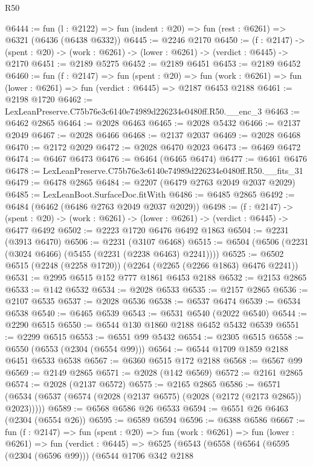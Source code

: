 \begin{lexlean}{R50}
\begin{coremodule}
@6444 := fun (l : @2122) => fun (indent : @20) => fun (rest : @6261) => @6321 (@6436 (@6438 @6332))
@6445 := @2246 @2170
@6450 := (f : @2147) ->
  (spent : @20) -> (work : @6261) -> (lower : @6261) -> (verdict : @6445) -> @2170
@6451 := @2189 @5275
@6452 := @2189 @6451
@6453 := @2189 @6452
@6460 := fun (f : @2147) =>
  fun (spent : @20) =>
  fun (work : @6261) => fun (lower : @6261) => fun (verdict : @6445) => @2187 @6453 @2188
@6461 := @2198 @1720
@6462 := LexLeanPreserve.C75b76e3c6140e74989d226234e0480ff.R50.__enc_3
@6463 := @6462 @2865
@6464 := @2028 @6463
@6465 := @2028 @5432
@6466 := @2137 @2049
@6467 := @2028 @6466
@6468 := @2137 @2037
@6469 := @2028 @6468
@6470 := @2172 @2029
@6472 := @2028 @6470 @2023
@6473 := @6469 @6472
@6474 := @6467 @6473
@6476 := @6464 (@6465 @6474)
@6477 := @6461 @6476
@6478 := LexLeanPreserve.C75b76e3c6140e74989d226234e0480ff.R50.__fits_31
@6479 := @6478 @2865
@6484 := @2207 (@6479 @2763 @2049 @2037 @2029)
@6485 := LexLeanBoot.SurfaceDoc.fitWith
@6486 := @6485 @2865
@6492 := @6484 (@6462 (@6486 @2763 @2049 @2037 @2029))
@6498 := (f : @2147) ->
  (spent : @20) -> (work : @6261) -> (lower : @6261) -> (verdict : @6445) -> @6477 @6492
@6502 := @2223 @1720 @6476 @6492 @1863
@6504 := @2231 (@3913 @6470)
@6506 := @2231 (@3107 @6468)
@6515 := @6504 (@6506 (@2231 (@3024 @6466) (@5455 (@2231 (@2238 @6463) @2241))))
@6525 := @6502 @6515 (@2248 (@2258 @1720)) (@2264 (@2265 (@2266 @1863) @6476 @2241))
@6531 := @2995 @6515 @152 @777 @1861 @6453 @2188
@6532 := @2153 @2865
@6533 := @142 @6532
@6534 := @2028 @6533
@6535 := @2157 @2865
@6536 := @2107 @6535
@6537 := @2028 @6536
@6538 := @6537 @6474
@6539 := @6534 @6538
@6540 := @6465 @6539
@6543 := @6531 @6540 (@2022 @6540)
@6544 := @2290 @6515
@6550 := @6544 @130 @1860 @2188 @6452 @5432 @6539
@6551 := @2299 @6515
@6553 := @6551 @99 @5432
@6554 := @2305 @6515
@6558 := @6550 (@6553 (@2304 (@6554 @99)))
@6564 := @6544 @1709 @1859 @2188 @6451 @6533 @6538
@6567 := @6360 @6515 @172 @2188
@6568 := @6567 @99
@6569 := @2149 @2865
@6571 := @2028 (@142 @6569)
@6572 := @2161 @2865
@6574 := @2028 (@2137 @6572)
@6575 := @2165 @2865
@6586 := @6571 (@6534 (@6537 (@6574 (@2028 (@2137 @6575) (@2028 (@2172 (@2173 @2865)) @2023)))))
@6589 := @6568 @6586 @26 @6533
@6594 := @6551 @26 @6463 (@2304 (@6554 @26))
@6595 := @6589 @6594
@6596 := @6388 @6586
@6667 := fun (f : @2147) =>
  fun (spent : @20) =>
  fun (work : @6261) =>
  fun (lower : @6261) =>
  fun (verdict : @6445) =>
  @6525
    (@6543
      (@6558
        (@6564
          (@6595 (@2304 (@6596 @99)))
          (@6544
            @1706
            @342
            @2188

\end{coremodule}
\end{lexlean}
